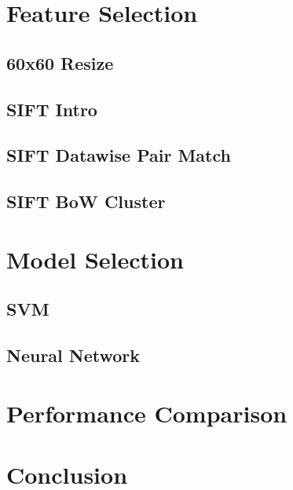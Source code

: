 
\section{Feature Selection}
\subsection*{60x60 Resize}
\subsection*{SIFT Intro}
\subsection*{SIFT Datawise Pair Match}
\subsection*{SIFT BoW Cluster}

\section{Model Selection}
\subsection*{SVM}
\subsection*{Neural Network}

\section{Performance Comparison}

\section{Conclusion}


